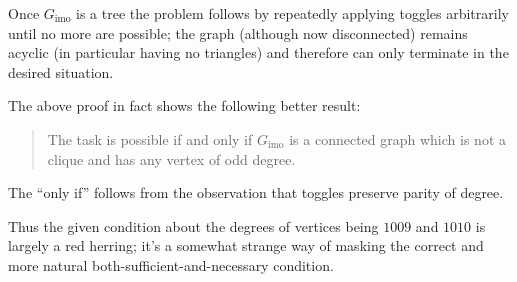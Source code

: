 Once $G_{\text{imo}}$ is a tree the problem follows by repeatedly applying
toggles arbitrarily until no more are possible;
the graph (although now disconnected) remains acyclic
(in particular having no triangles)
and therefore can only terminate in the desired situation.

\begin{remark*}
  The above proof in fact shows the following better result:
  \begin{quote}
  The task is possible if and only if
  $G_{\text{imo}}$ is a connected graph which is not a clique
  and has any vertex of odd degree.
  \end{quote}
  The ``only if'' follows from the observation
  that toggles preserve parity of degree.

  Thus the given condition about the degrees of vertices
  being $1009$ and $1010$ is largely a red herring;
  it's a somewhat strange way of masking the correct and more natural
  both-sufficient-and-necessary condition.
\end{remark*}
